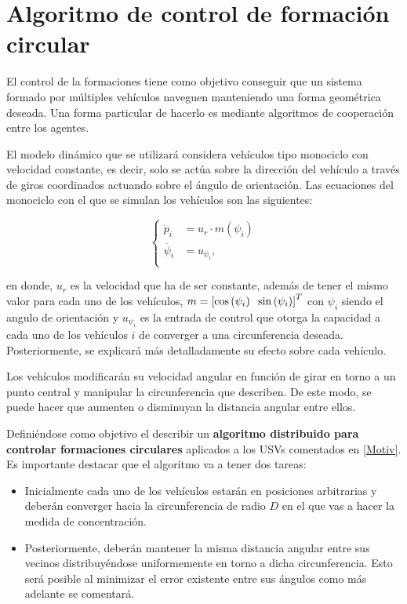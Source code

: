 \section{Algoritmo de control de formación circular}

El control de la formaciones tiene como objetivo conseguir que un sistema formado por múltiples vehículos naveguen manteniendo una forma geométrica deseada. Una forma particular de hacerlo es mediante algoritmos de cooperación entre los agentes.

El modelo dinámico que se utilizará considera vehículos tipo monociclo con velocidad constante, es decir, solo se actúa sobre la dirección del vehículo a través de giros coordinados actuando sobre el ángulo de orientación. Las ecuaciones del monociclo con el que se simulan los vehículos son las siguientes: 

\begin{equation} \label{Dinamica}
	 \left \{
    \begin{aligned}
\dot{p}_{i}&=u_{r}\cdot{m\left(\psi_{i}\right)}\\
\dot{\psi_{i}}&=u_{\psi_{i}},\\
    \end{aligned}
  \right.
\end{equation}

en donde, $u_{r}$ es la velocidad que ha de ser constante, además de tener el mismo valor para cada uno de los vehículos, $m=\left[\cos\left(\psi_{i}\right)\hspace{2mm}\sin\left(\psi_{i}\right)\right]^{T}$ con $\psi_{i}$ siendo el angulo de orientación y $u_{\psi_{i}}$ es la entrada de control que otorga la capacidad a cada uno de los vehículos $i$ de converger a una circunferencia deseada. Posteriormente, se explicará más detalladamente su efecto sobre cada vehículo.

Los vehículos modificarán su velocidad angular en función de girar en torno a un punto central y manipular la circunferencia que describen. De este modo, se puede hacer que aumenten o disminuyan la distancia angular entre ellos.

Definiéndose como objetivo el describir un \textbf{algoritmo distribuido para controlar formaciones circulares} aplicados a los USVs comentados en \ref{Motiv}. Es importante destacar que el algoritmo va a tener dos tareas:
\newpage
\begin{itemize}
	\item Inicialmente cada uno de los vehículos estarán en posiciones arbitrarias y deberán converger hacia la circunferencia de radio $D$ en el que vas a hacer la medida de concentración.
	\item Posteriormente, deberán mantener la misma distancia angular entre sus vecinos distribuyéndose uniformemente en torno a dicha circunferencia. Esto será posible al minimizar el error existente entre sus ángulos como más adelante se comentará.
\end{itemize}

